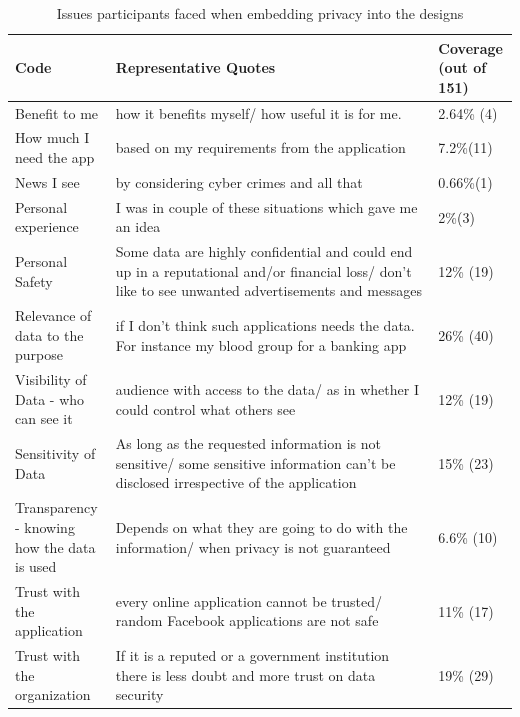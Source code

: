 \documentclass[conference]{IEEEtran}
\begin{document}
\begin{center}
\begin{table}[htbp]
\caption{Issues participants faced when embedding privacy into the designs}
\begin{center}
\begin{adjustbox}{width=1\textwidth}
\begin{tabular}{|p{0.20\linewidth}|p{0.64\linewidth}|p{0.16\linewidth}|}
\hline
Code &  Representative Quotes & Coverage (out of 151)\\
\hline
Benefit to me &how it benefits myself/ how useful it is for me. & 2.64\% (4)\\
\hline
How much I need the app &  based on my requirements from the application & 7.2\%(11)\\
\hline
News I see  & by considering cyber crimes and all that & 0.66\%(1) \\
\hline
Personal experience &  I was in couple of these situations which gave me an idea & 2\%(3) \\
\hline
Personal Safety & Some data are highly confidential and could end up in a reputational and/or financial loss/  don't like to see unwanted advertisements and messages & 12\% (19)\\ 
\hline
Relevance of data to the purpose &if I don't think such applications needs the data. For instance my blood group for a banking app
 & 26\% (40)\\ 
\hline
Visibility of Data - who can see it & audience with access to the data/ as in whether I could control what others see & 12\% (19)\\ 
\hline
Sensitivity of Data & As long as the requested information is not sensitive/  some sensitive information can't be disclosed irrespective of the application
 & 15\% (23)\\ 
\hline
Transparency - knowing how the data is used & Depends on what they are going to do with the information/ when privacy is not guaranteed & 6.6\% (10)\\ 
\hline
Trust with the application & every online application cannot be trusted/ random Facebook applications are not safe & 11\% (17)\\ 
\hline
Trust with the organization & If it is a reputed or a government institution there is less doubt and more trust on data security
 & 19\% (29)\\ 
\hline
\end{tabular}
\end{adjustbox}
\end{center}
\end{table}
\end{center}
\end{document}
